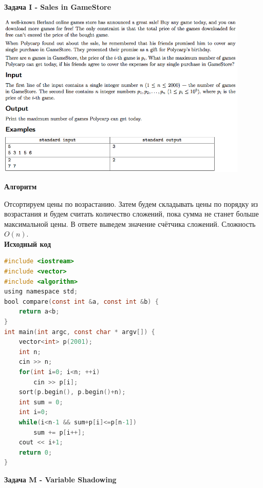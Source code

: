 \documentclass[a4paper,12pt]{article}
\begin{document}
\newpage
\textbf{{\large Задача I - Sales in GameStore}}

\begin{center}
\includegraphics[width=0.9\textwidth]{CT_ACM_WEST/CT_ACM_WEST_I.png}\\ [1cm]
\end{center}

\textbf{{\large Алгоритм}}

Отсортируем цены по возрастанию. Затем будем складывать цены по порядку из возрастания и будем считать количество сложений, пока сумма не станет больше максимальной цены. В ответе выведем значение счётчика сложений. Сложность $O(n)$. \\

\textbf{{\large Исходный код}} \\
\begin{lstlisting}[language=C]
#include <iostream>
#include <vector>
#include <algorithm>
using namespace std;
bool compare(const int &a, const int &b) {
    return a<b;
}
int main(int argc, const char * argv[]) {
    vector<int> p(2001);
    int n;
    cin >> n;
    for(int i=0; i<n; ++i)
        cin >> p[i];
    sort(p.begin(), p.begin()+n);
    int sum = 0;
    int i=0;
    while(i<n-1 && sum+p[i]<=p[n-1])
        sum += p[i++];
    cout << i+1;
    return 0;
}
\end{lstlisting}

\newpage
\textbf{{\large Задача M - Variable Shadowing}}
\end{document}
